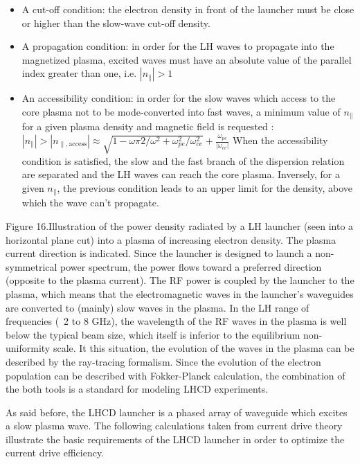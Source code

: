 \begin{itemize}
\item  A cut-off condition: the electron density in front of the launcher must be close or higher than the slow-wave cut-off density.
\item A propagation condition: in order for the LH waves to propagate into the magnetized plasma, excited waves must have an absolute value of the parallel index greater than one, i.e. $|n_{\parallel}|>1$ 
\item An accessibility condition: in order for the slow waves which access to the core plasma not to be mode-converted into fast waves, a minimum value of $n_{\parallel}$ for a given plasma density and magnetic field is requested :
$|n_{\parallel} |>| n_{\parallel, \mathrm{access}} | \approx \sqrt{1- \omega \pi2 /\omega^2 + \omega_{pe}^2 /\omega_{ce}^2 } + \frac{\omega_{pe} }{| \omega_{ce} |}$ 
When the accessibility condition is satisfied, the slow and the fast branch of the dispersion relation are separated and the LH waves can reach the core plasma.
Inversely, for a given $n_{\parallel}$, the previous condition leads to an upper limit for the density, above which the wave can’t propagate.
\end{itemize}

Figure 16.Illustration of the power density radiated by a LH launcher (seen into a horizontal plane cut) into a plasma of increasing electron density. The plasma current direction is indicated. Since the launcher is designed to launch a non-symmetrical power spectrum, the power flows toward a preferred direction (opposite to the plasma current). 
The RF power is coupled by the launcher to the plasma, which means that the electromagnetic waves in the launcher’s waveguides are converted to (mainly) slow waves in the plasma. In the LH range of frequencies (~2 to 8 GHz), the wavelength of the RF waves in the plasma is well below the typical beam size, which itself is inferior to the equilibrium non-uniformity scale. It this situation, the evolution of the waves in the plasma can be described by the ray-tracing formalism. Since the evolution of the electron population can be described with Fokker-Planck calculation, the combination of the both tools is a standard for modeling LHCD experiments.

As said before, the LHCD launcher is a phased array of waveguide which excites a slow plasma wave. The following calculations taken from current drive theory illustrate the basic requirements of the LHCD launcher in order to optimize the current drive efficiency. 

